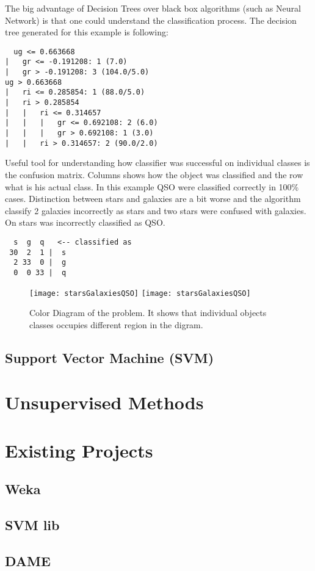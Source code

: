 The big advantage of Decision Trees over black box algorithms (such as
Neural Network) is that one could understand the classification
process. The decision tree generated for this example is following:

\begin{lstlisting}
  ug <= 0.663668
|   gr <= -0.191208: 1 (7.0)
|   gr > -0.191208: 3 (104.0/5.0)
ug > 0.663668
|   ri <= 0.285854: 1 (88.0/5.0)
|   ri > 0.285854
|   |   ri <= 0.314657
|   |   |   gr <= 0.692108: 2 (6.0)
|   |   |   gr > 0.692108: 1 (3.0)
|   |   ri > 0.314657: 2 (90.0/2.0)
\end{lstlisting}

Useful tool for understanding how classifier was successful on
individual classes is the confusion matrix. Columns shows how the
object was classified and the row what is his actual class. In this
example QSO were classified correctly in 100\% cases. Distinction
between stars and galaxies are a bit worse and the algorithm classify 2
galaxies incorrectly as stars and two stars were confused with
galaxies. On stars was incorrectly classified as QSO.
 
\begin{lstlisting}
  s  g  q   <-- classified as
 30  2  1 |  s 
  2 33  0 |  g 
  0  0 33 |  q 
\end{lstlisting}

\begin{figure}[!htbp]
        \leavevmode
        \ifpdf
        \texttt{[image: starsGalaxiesQSO]}
        \else
        \texttt{[image: starsGalaxiesQSO]}
        \fi
        \caption{Color Diagram of the problem. It shows that individual
        objects classes occupies different region in the digram.}
        \label{FigStarsGalaxiesQSO}
\end{figure}

\clearpage


\subsection{Support Vector Machine (SVM)}

\section{Unsupervised Methods}
\section{Existing Projects}
\subsection{Weka}
\subsection{SVM lib}
\subsection{DAME}